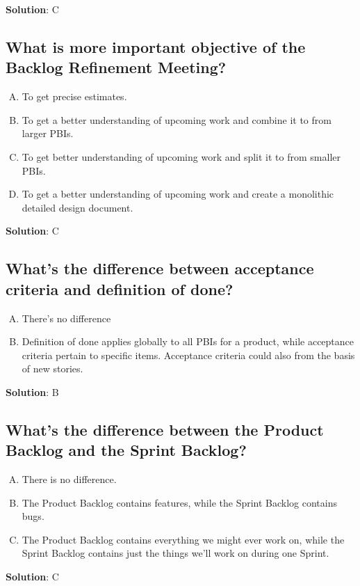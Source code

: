 \textbf{Solution}: C


\subsection{What is more important objective of the Backlog Refinement Meeting?}
\begin{enumerate}[A)]
  \item To get precise estimates.
  \item To get a better understanding of upcoming work and combine it to from larger PBIs.
  \item To get better understanding of upcoming work and split it to from smaller PBIs.
  \item To get a better understanding of upcoming work and create a monolithic detailed
    design document.
\end{enumerate}


\textbf{Solution}: C


\subsection{What's the difference between acceptance criteria and definition of done?}
\begin{enumerate}[A)]
  \item There's no difference
  \item Definition of done applies globally to all PBIs for a product, while acceptance
    criteria pertain to specific items. Acceptance criteria could also from the basis of new
    stories.
\end{enumerate}


\textbf{Solution}: B


\subsection{What's the difference between the Product Backlog and the Sprint Backlog?}
\begin{enumerate}[A)]
  \item There is no difference.
  \item The Product Backlog contains features, while the Sprint Backlog contains bugs.
  \item The Product Backlog contains everything we might ever work on, while the Sprint Backlog
    contains just the things we'll work on during one Sprint.
\end{enumerate}


\textbf{Solution}: C


